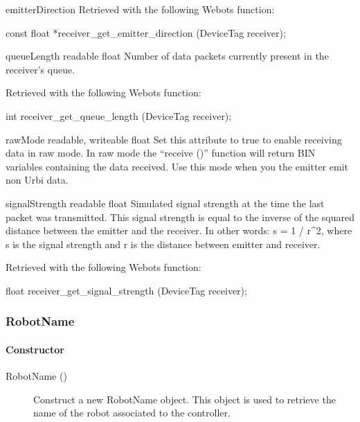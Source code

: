 \begin{itemize}
\begin{attribute}{emitterDirection}
  Retrieved with the following Webots function:
\begin{cxx}
const float *receiver_get_emitter_direction  (DeviceTag receiver);
\end{cxx}
\end{attribute}

\begin{attribute}{queueLength}
  {readable}
  {float}
  {}
  Number of data packets currently present in the
  receiver's queue.

  Retrieved with the following Webots function:
\begin{cxx}
int receiver_get_queue_length  (DeviceTag receiver);
\end{cxx}
\end{attribute}

\begin{attribute}{rawMode}
  {readable, writeable}
  {float}
  {}
  Set this attribute to true to enable receiving data in
  raw mode.  In raw mode the ``receive ()'' function will return BIN
  variables containing the data received. Use this mode when you the
  emitter emit non Urbi data.
\end{attribute}

\begin{attribute}{signalStrength}
  {readable}
  {float}
  {}
  Simulated signal strength at the time the last packet
  was transmitted.  This signal strength is equal to the inverse of the
  squared distance between the emitter and the receiver. In other
  words: s = 1 / r\^{}2, where s is the signal strength and r is the
  distance between emitter and receiver.

  Retrieved with the following Webots function:
\begin{cxx}
float receiver_get_signal_strength  (DeviceTag receiver);
\end{cxx}
\end{attribute}
\end{itemize}

\subsubsection{RobotName}

\paragraph{Constructor}

\noindent
\begin{description}
\item[{RobotName ()}] Construct a new RobotName object. This object is
  used to retrieve the name of the robot associated to the \urbi
  controller.
\end{description}

